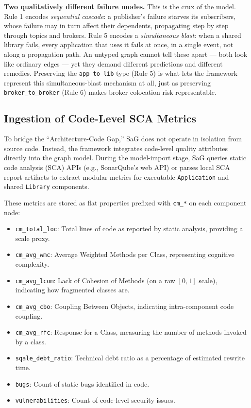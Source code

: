 \documentclass[review]{elsarticle}
\begin{document}
\textbf{Two qualitatively different failure modes.} This is the crux of the model. Rule 1 encodes
\emph{sequential cascade}: a publisher's failure starves its subscribers, whose failure may in turn
affect their dependents, propagating step by step through topics and brokers. Rule 5 encodes a
\emph{simultaneous blast}: when a shared library fails, every application that uses it fails at
once, in a single event, not along a propagation path. An untyped graph cannot tell these apart ---
both look like ordinary edges --- yet they demand different predictions and different remedies.
Preserving the \texttt{app\_to\_lib} type (Rule 5) is what lets the framework represent this
simultaneous-blast mechanism at all, just as preserving \texttt{broker\_to\_broker} (Rule 6) makes
broker-colocation risk representable.

\subsection{Ingestion of Code-Level SCA Metrics}

To bridge the ``Architecture-Code Gap,'' SaG does not operate in isolation from source code.
Instead, the framework integrates code-level quality attributes directly into the graph model.
During the model-import stage, SaG queries static code analysis (SCA) APIs (e.g., SonarQube's web
API) or parses local SCA report artifacts to extract modular metrics for executable
\texttt{Application} and shared \texttt{Library} components.

These metrics are stored as flat properties prefixed with \texttt{cm\_*} on each component node:
\begin{itemize}
\item \texttt{cm\_total\_loc}: Total lines of code as reported by static analysis, providing a scale
  proxy.
\item \texttt{cm\_avg\_wmc}: Average Weighted Methods per Class, representing cognitive complexity.
\item \texttt{cm\_avg\_lcom}: Lack of Cohesion of Methods (on a raw $[0,1]$ scale), indicating how
  fragmented classes are.
\item \texttt{cm\_avg\_cbo}: Coupling Between Objects, indicating intra-component code coupling.
\item \texttt{cm\_avg\_rfc}: Response for a Class, measuring the number of methods invoked by a
  class.
\item \texttt{sqale\_debt\_ratio}: Technical debt ratio as a percentage of estimated rewrite time.
\item \texttt{bugs}: Count of static bugs identified in code.
\item \texttt{vulnerabilities}: Count of code-level security issues.
\end{itemize}
\end{document}
